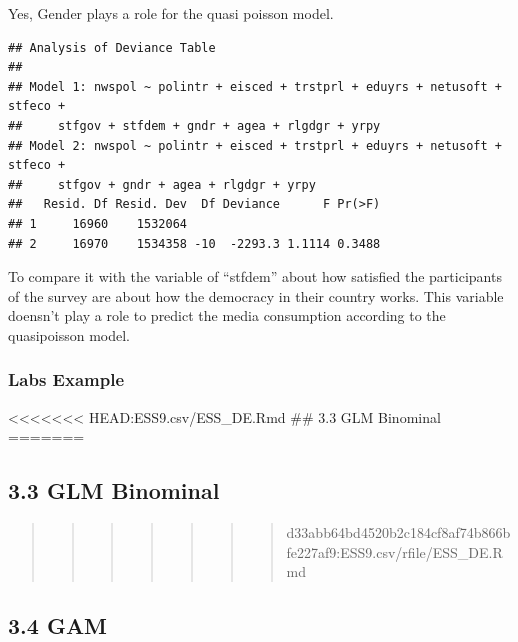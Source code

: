 \documentclass[
]{article}
\begin{document}
Yes, Gender plays a role for the quasi poisson model.

\begin{verbatim}
## Analysis of Deviance Table
## 
## Model 1: nwspol ~ polintr + eisced + trstprl + eduyrs + netusoft + stfeco + 
##     stfgov + stfdem + gndr + agea + rlgdgr + yrpy
## Model 2: nwspol ~ polintr + eisced + trstprl + eduyrs + netusoft + stfeco + 
##     stfgov + gndr + agea + rlgdgr + yrpy
##   Resid. Df Resid. Dev  Df Deviance      F Pr(>F)
## 1     16960    1532064                           
## 2     16970    1534358 -10  -2293.3 1.1114 0.3488
\end{verbatim}

To compare it with the variable of ``stfdem'' about how satisfied the
participants of the survey are about how the democracy in their country
works. This variable doensn't play a role to predict the media
consumption according to the quasipoisson model.

\hypertarget{labs-example}{%
\subsubsection{Labs Example}\label{labs-example}}

\textless\textless\textless\textless\textless\textless\textless{}
HEAD:ESS9.csv/ESS\_DE.Rmd \#\# 3.3 GLM Binominal =======

\hypertarget{glm-binominal}{%
\subsection{3.3 GLM Binominal}\label{glm-binominal}}

\begin{quote}
\begin{quote}
\begin{quote}
\begin{quote}
\begin{quote}
\begin{quote}
\begin{quote}
d33abb64bd4520b2c184cf8af74b866bfe227af9:ESS9.csv/rfile/ESS\_DE.Rmd
\end{quote}
\end{quote}
\end{quote}
\end{quote}
\end{quote}
\end{quote}
\end{quote}

\hypertarget{gam}{%
\subsection{3.4 GAM}\label{gam}}
\end{document}
